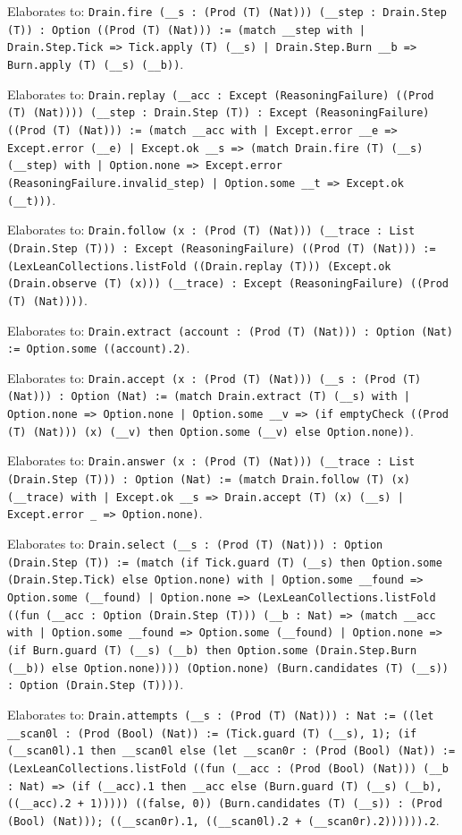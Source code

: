 \documentclass[11pt]{article}
\begin{document}
\noindent Elaborates to: \texttt{Drain.fire (\_\_s : (Prod (T) (Nat))) (\_\_step : Drain.Step (T)) : Option ((Prod (T) (Nat))) := (match \_\_step with | Drain.Step.Tick => Tick.apply (T) (\_\_s) | Drain.Step.Burn \_\_b => Burn.apply (T) (\_\_s) (\_\_b))}.\par
\noindent Elaborates to: \texttt{Drain.replay (\_\_acc : Except (ReasoningFailure) ((Prod (T) (Nat)))) (\_\_step : Drain.Step (T)) : Except (ReasoningFailure) ((Prod (T) (Nat))) := (match \_\_acc with | Except.error \_\_e => Except.error (\_\_e) | Except.ok \_\_s => (match Drain.fire (T) (\_\_s) (\_\_step) with | Option.none => Except.error (ReasoningFailure.invalid\_step) | Option.some \_\_t => Except.ok (\_\_t)))}.\par
\noindent Elaborates to: \texttt{Drain.follow (x : (Prod (T) (Nat))) (\_\_trace : List (Drain.Step (T))) : Except (ReasoningFailure) ((Prod (T) (Nat))) := (LexLeanCollections.listFold ((Drain.replay (T))) (Except.ok (Drain.observe (T) (x))) (\_\_trace) : Except (ReasoningFailure) ((Prod (T) (Nat))))}.\par
\noindent Elaborates to: \texttt{Drain.extract (account : (Prod (T) (Nat))) : Option (Nat) := Option.some ((account).2)}.\par
\noindent Elaborates to: \texttt{Drain.accept (x : (Prod (T) (Nat))) (\_\_s : (Prod (T) (Nat))) : Option (Nat) := (match Drain.extract (T) (\_\_s) with | Option.none => Option.none | Option.some \_\_v => (if emptyCheck ((Prod (T) (Nat))) (x) (\_\_v) then Option.some (\_\_v) else Option.none))}.\par
\noindent Elaborates to: \texttt{Drain.answer (x : (Prod (T) (Nat))) (\_\_trace : List (Drain.Step (T))) : Option (Nat) := (match Drain.follow (T) (x) (\_\_trace) with | Except.ok \_\_s => Drain.accept (T) (x) (\_\_s) | Except.error \_ => Option.none)}.\par
\noindent Elaborates to: \texttt{Drain.select (\_\_s : (Prod (T) (Nat))) : Option (Drain.Step (T)) := (match (if Tick.guard (T) (\_\_s) then Option.some (Drain.Step.Tick) else Option.none) with | Option.some \_\_found => Option.some (\_\_found) | Option.none => (LexLeanCollections.listFold ((fun (\_\_acc : Option (Drain.Step (T))) (\_\_b : Nat) => (match \_\_acc with | Option.some \_\_found => Option.some (\_\_found) | Option.none => (if Burn.guard (T) (\_\_s) (\_\_b) then Option.some (Drain.Step.Burn (\_\_b)) else Option.none)))) (Option.none) (Burn.candidates (T) (\_\_s)) : Option (Drain.Step (T))))}.\par
\noindent Elaborates to: \texttt{Drain.attempts (\_\_s : (Prod (T) (Nat))) : Nat := ((let \_\_scan0l : (Prod (Bool) (Nat)) := (Tick.guard (T) (\_\_s), 1); (if (\_\_scan0l).1 then \_\_scan0l else (let \_\_scan0r : (Prod (Bool) (Nat)) := (LexLeanCollections.listFold ((fun (\_\_acc : (Prod (Bool) (Nat))) (\_\_b : Nat) => (if (\_\_acc).1 then \_\_acc else (Burn.guard (T) (\_\_s) (\_\_b), ((\_\_acc).2 + 1))))) ((false, 0)) (Burn.candidates (T) (\_\_s)) : (Prod (Bool) (Nat))); ((\_\_scan0r).1, ((\_\_scan0l).2 + (\_\_scan0r).2)))))).2}.\par
\end{document}
